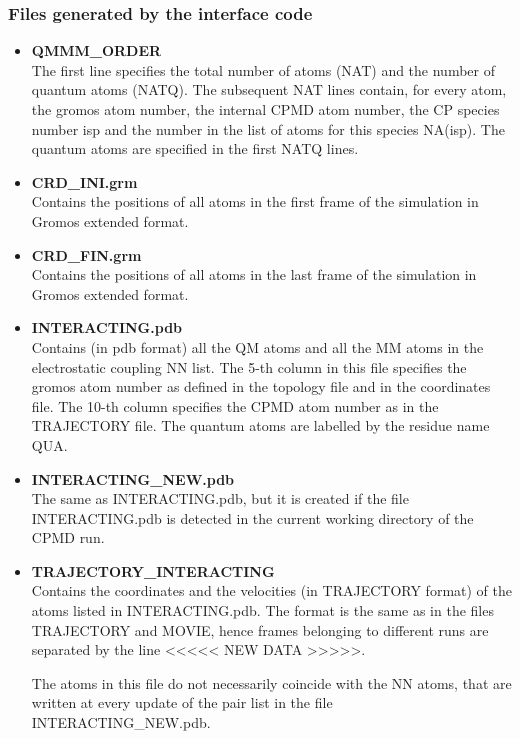 \documentclass[twoside,10pt,titlepage,a4paper]{article}
\begin{document}
\subsubsection{Files generated by the interface code}
\label{sec:qmmm-files}
\begin{itemize}

\item {\bf QMMM\_ORDER}\\
The first line specifies the total number of atoms (NAT) and the number of quantum
atoms (NATQ). The subsequent NAT lines contain, for every atom, the gromos atom number,
the internal CPMD atom number, the CP species number isp and the number in the list
of atoms for this species NA(isp). The quantum atoms are specified in the first NATQ lines.

\item {\bf CRD\_INI.grm}\\
Contains the positions of all atoms in the first frame of the simulation in
Gromos extended format.

\item {\bf CRD\_FIN.grm}\\
Contains the positions of all atoms in the last frame of the simulation in
Gromos extended format.

\item {\bf INTERACTING.pdb}\\
Contains (in pdb format) all the QM atoms and all the MM atoms in the electrostatic
coupling NN list. The 5-th column in this file specifies the gromos atom number as
defined in the topology file and in the coordinates file. The 10-th column specifies
the CPMD atom number as in the TRAJECTORY file. The quantum atoms are labelled by
the residue name QUA.

\item {\bf INTERACTING\_NEW.pdb}\\
The same as INTERACTING.pdb, but it is created if the file INTERACTING.pdb
is detected in the current working directory of the CPMD run.

\item {\bf TRAJECTORY\_INTERACTING}\\
Contains the coordinates and the velocities (in TRAJECTORY format) of the atoms
listed in INTERACTING.pdb. The format is the same as in the files TRAJECTORY and MOVIE,
hence frames belonging to different runs are separated by the line <<<<< NEW DATA >>>>>.

The atoms in this file do not necessarily coincide with the NN atoms, that are written
at every update of the pair list in the file INTERACTING\_NEW.pdb.



\end{itemize}
\end{document}

